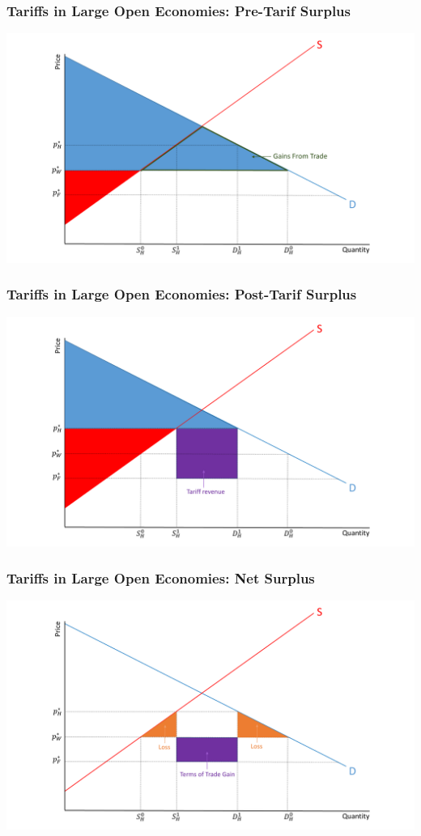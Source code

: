 \documentclass{beamer}
\begin{document}
\begin{frame}
	\frametitle{Tariffs in Large Open Economies:  Pre-Tarif Surplus}
	\includegraphics[scale=0.3]{SL_12.pdf}

	
\end{frame}

\begin{frame}
	\frametitle{Tariffs in Large Open Economies:  Post-Tarif Surplus}
	\includegraphics[scale=0.3]{SL_13.pdf}
	
	
\end{frame}

\begin{frame}
	\frametitle{Tariffs in Large Open Economies: Net Surplus}
\includegraphics[scale=0.3]{SL_14.pdf}

\end{frame}
\end{document}

